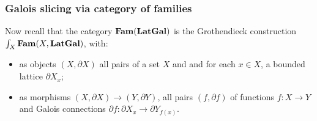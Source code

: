 \subsubsection{Galois slicing via category of families}

Now recall that the category $\mathbf{Fam}(\mathbf{LatGal})$ is the Grothendieck construction $\int_{X}\mathbf{Fam}(X,
\mathbf{LatGal})$, with:
\begin{itemize}
\item as objects $(X, \partial X)$ all pairs of a set $X$ and and for each $x \in X$, a bounded lattice
$\partial X_x$;
\item as morphisms $(X, \partial X) \to (Y, \partial Y)$, all pairs $(f, \partial f)$ of functions $f: X \to
Y$ and Galois connections $\partial f: \partial X_x \to \partial Y_{f(x)}$.
\end{itemize}

